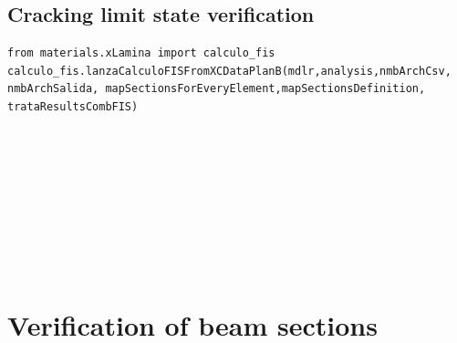 \subsection{Cracking limit state verification}
\begin{verbatim}
from materials.xLamina import calculo_fis
calculo_fis.lanzaCalculoFISFromXCDataPlanB(mdlr,analysis,nmbArchCsv,
nmbArchSalida, mapSectionsForEveryElement,mapSectionsDefinition,
trataResultsCombFIS)
\end{verbatim}
\begin{paramFuncTable}
\mdlr{} \\
\analysis{} \\
\\
\nmbArchSalida{}\\
\mapSectionsForEveryElement{} \\
\mapSectionsDefinition{} \\
\mapInteractionDiagrams{} \\
\trataResultsCombFIS{} \\
\end{paramFuncTable}








\section{Verification of beam sections}

